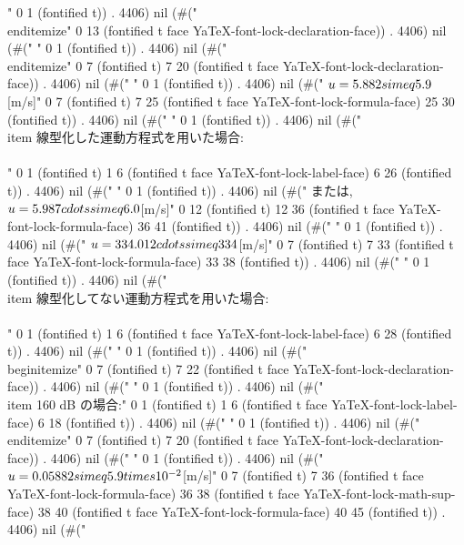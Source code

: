 " 0 1 (fontified t)) . 4406) nil (#("\\end{itemize}" 0 13 (fontified t face YaTeX-font-lock-declaration-face)) . 4406) nil (#("
" 0 1 (fontified t)) . 4406) nil (#("       \\end{itemize}" 0 7 (fontified t) 7 20 (fontified t face YaTeX-font-lock-declaration-face)) . 4406) nil (#("
" 0 1 (fontified t)) . 4406) nil (#("	      $u=5.882\\simeq5.9$[m/s]" 0 7 (fontified t) 7 25 (fontified t face YaTeX-font-lock-formula-face) 25 30 (fontified t)) . 4406) nil (#("
" 0 1 (fontified t)) . 4406) nil (#("	\\item 線型化した運動方程式を用いた場合:\\\\" 0 1 (fontified t) 1 6 (fontified t face YaTeX-font-lock-label-face) 6 26 (fontified t)) . 4406) nil (#("
" 0 1 (fontified t)) . 4406) nil (#("	      または, $u=5.987\\cdots\\simeq6.0$[m/s]" 0 12 (fontified t) 12 36 (fontified t face YaTeX-font-lock-formula-face) 36 41 (fontified t)) . 4406) nil (#("
" 0 1 (fontified t)) . 4406) nil (#("	      $u=334.012\\cdots\\simeq334$[m/s]" 0 7 (fontified t) 7 33 (fontified t face YaTeX-font-lock-formula-face) 33 38 (fontified t)) . 4406) nil (#("
" 0 1 (fontified t)) . 4406) nil (#("	\\item 線型化してない運動方程式を用いた場合:\\\\" 0 1 (fontified t) 1 6 (fontified t face YaTeX-font-lock-label-face) 6 28 (fontified t)) . 4406) nil (#("
" 0 1 (fontified t)) . 4406) nil (#("       \\begin{itemize}" 0 7 (fontified t) 7 22 (fontified t face YaTeX-font-lock-declaration-face)) . 4406) nil (#("
" 0 1 (fontified t)) . 4406) nil (#(" \\item 160 dB の場合:" 0 1 (fontified t) 1 6 (fontified t face YaTeX-font-lock-label-face) 6 18 (fontified t)) . 4406) nil (#("
" 0 1 (fontified t)) . 4406) nil (#("       \\end{itemize}" 0 7 (fontified t) 7 20 (fontified t face YaTeX-font-lock-declaration-face)) . 4406) nil (#("
" 0 1 (fontified t)) . 4406) nil (#("	      $u=0.05882\\simeq5.9\\times10^{-2}$[m/s]" 0 7 (fontified t) 7 36 (fontified t face YaTeX-font-lock-formula-face) 36 38 (fontified t face YaTeX-font-lock-math-sup-face) 38 40 (fontified t face YaTeX-font-lock-formula-face) 40 45 (fontified t)) . 4406) nil (#("
